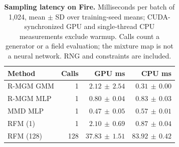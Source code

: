 \begin{table}[t]
\caption{\textbf{Sampling latency on Fire.} Milliseconds per batch of 1,024, mean $\pm$ SD over training-seed means; CUDA-synchronized GPU and single-thread CPU measurements exclude warmup. Calls count a generator or a field evaluation; the mixture map is not a neural network. RNG and constraints are included.}
\label{tab:latency}
\centering\small
\begin{tabular}{@{}lrrr@{}}
\toprule
Method & Calls & GPU ms & CPU ms \\
\midrule
R-MGM GMM & 1 & $2.12\,\pm\,2.54$ & $0.31\,\pm\,0.00$ \\
R-MGM MLP & 1 & $0.80\,\pm\,0.04$ & $0.83\,\pm\,0.03$ \\
MMD MLP & 1 & $0.47\,\pm\,0.05$ & $0.57\,\pm\,0.01$ \\
RFM (1) & 1 & $2.10\,\pm\,0.69$ & $0.87\,\pm\,0.04$ \\
RFM (128) & 128 & $37.83\,\pm\,1.51$ & $83.92\,\pm\,0.42$ \\
\bottomrule
\end{tabular}
\end{table}
